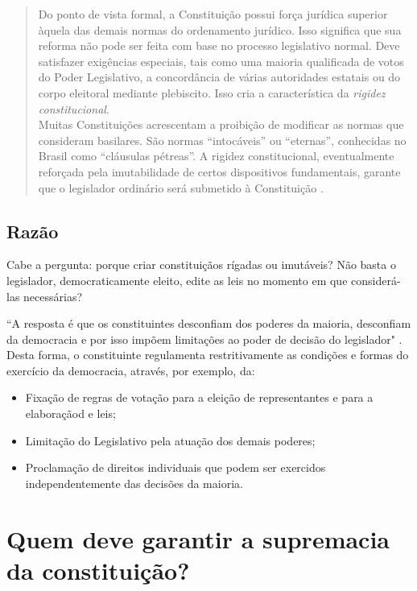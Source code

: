 \documentclass{article}
\begin{document}
\begin{quote}
    Do ponto de vista formal, a Constituição possui força jurídica superior àquela das demais normas do ordenamento jurídico. Isso significa que sua reforma não pode ser feita com base no processo legislativo normal. Deve satisfazer exigências especiais, tais como uma maioria qualificada de votos do Poder Legislativo, a concordância de várias autoridades estatais ou do corpo eleitoral mediante plebiscito. Isso cria a característica da \textit{rigidez constitucional}.\\
    Muitas Constituições acrescentam a proibição de modificar as normas que consideram basilares. São normas “intocáveis” ou “eternas”, conhecidas no Brasil como “cláusulas pétreas”. A rigidez constitucional, eventualmente reforçada pela imutabilidade de certos dispositivos fundamentais, garante que o legislador ordinário será submetido à Constituição \cite[p.~19]{dimoulis_curso_2016}.
\end{quote}

\subsection{Razão}

Cabe a pergunta: porque criar constituiçãos rígadas ou imutáveis? Não basta o legislador, democraticamente eleito, edite as leis no momento em que considerá-las necessárias?

``A resposta é que os constituintes desconfiam dos poderes da maioria, desconfiam da democracia e por isso impõem limitações ao poder de decisão do legislador" \cite[p.~22]{dimoulis_curso_2016}. Desta forma, o constituinte regulamenta restritivamente as condições e formas do exercício da democracia, através, por exemplo, da:

\begin{itemize}
    \item Fixação de regras de votação para a eleição de representantes e para a elaboraçãod e leis;
    \item Limitação do Legislativo pela atuação dos demais poderes;
    \item Proclamação de direitos individuais que podem ser exercidos independentemente das decisões da maioria.
\end{itemize}

\section{Quem deve garantir a supremacia da constituição?}
\end{document}
